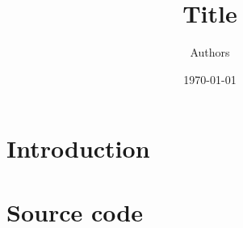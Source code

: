 \documentclass[a4paper, 10pt, final]{article}
\title{Title}
\author{Authors}
\date{\today}
\begin{document}
\maketitle
\pagestyle{headings}

\section*{Introduction}

\newpage
\appendix
\section{Source code}
\end{document}

